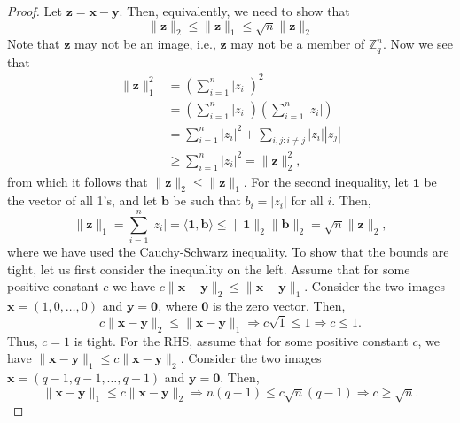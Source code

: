\documentclass[pdflatex,sn-mathphys-num]{sn-jnl}
\theoremstyle{definition}
\newcommand{\vtr}[1]{\mathbf{#1}}
\newcommand{\norm}[1]{\lVert{#1}\rVert}
\begin{document}
\begin{proof}
Let $\vtr{z} = \vtr{x} - \vtr{y}$. Then, equivalently, we need to show that
\[
\norm{\vtr{z}}_2 \leq \norm{\vtr{z}}_1 \leq \sqrt{n}\norm{\vtr{z}}_2
\]
Note that $\vtr{z}$ may not be an image, i.e., $\vtr{z}$ may not be a member of $\mathbb{Z}_q^n$. Now we see that
\begin{align*}
  \norm{\vtr{z}}_1^2 &= \left( \sum_{i = 1}^n |z_i| \right)^2 \\
  &= \left( \sum_{i = 1}^n |z_i| \right) \left( \sum_{i = 1}^n |z_i| \right)\\
  &=  \sum_{i = 1}^n |z_i|^2  +  \sum_{i, j : i \neq j} |z_i||z_j| \\
  &\geq \sum_{i = 1}^n |z_i|^2 =  \norm{\vtr{z}}_2^2,
\end{align*}
from which it follows that $\norm{\vtr{z}}_2 \leq \norm{\vtr{z}}_1$. For the second inequality, let $\vtr{1}$ be the vector of all 1's, and let $\vtr{b}$ be such that $b_i = |z_i|$ for all $i$. Then,
\begin{equation*}
  \norm{\vtr{z}}_1 = \sum_{i=1}^n |z_i| = \langle \vtr{1}, \vtr{b} \rangle  \leq \norm{\vtr{1}}_2 \norm{\vtr{b}}_2 = \sqrt{n} \norm{\vtr{z}}_2,
\end{equation*}
where we have used the Cauchy-Schwarz inequality. To show that the bounds are tight, let us first consider the inequality on the left. Assume that for some positive constant $c$ we have $c \norm{\vtr{x} - \vtr{y}}_2 \leq \norm{\vtr{x} - \vtr{y}}_1$. Consider the two images $\vtr{x} = (1, 0, \ldots, 0)$ and $\vtr{y} = \vtr{0}$, where $\vtr{0}$ is the zero vector. Then,
\[
c \norm{\vtr{x} - \vtr{y}}_2 \leq \norm{\vtr{x} - \vtr{y}}_1 \Rightarrow c \sqrt{1} \leq 1 \Rightarrow c \leq 1.
\]
Thus, $c = 1$ is tight. For the RHS, assume that for some positive constant $c$, we have $ \norm{\vtr{x} - \vtr{y}}_1 \leq c \norm{\vtr{x} - \vtr{y}}_2$.  Consider the two images $\vtr{x} = (q-1, q-1, \ldots, q-1)$ and $\vtr{y} = \vtr{0}$. Then,
\[
\norm{\vtr{x} - \vtr{y}}_1 \leq c \norm{\vtr{x} - \vtr{y}}_2 \Rightarrow n(q-1) \leq c \sqrt{n}(q-1) \Rightarrow c \geq \sqrt{n}. 
\]
\end{proof}
\end{document}
